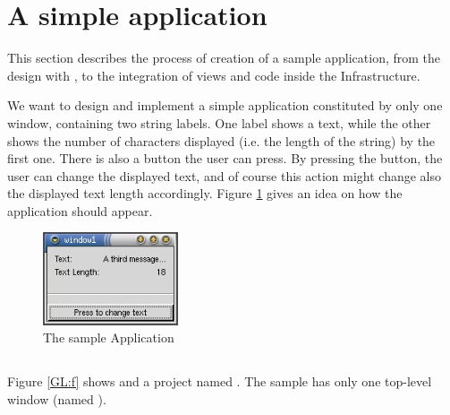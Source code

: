 

\section{\label{SAP} A simple application}
This section describes the process of creation of a sample
application, from the design with \glade, to the integration of views
and code inside the \mvco Infrastructure.

We want to design and implement a simple application constituted by
only one window, containing two string labels. One label shows a text,
while the other shows the number of characters displayed (i.e. the
length of the string) by the first one. There is also a button the
user can press. By pressing the button, the user can change the
displayed text, and of course this action might change also the
displayed text length accordingly. Figure \ref{EX:f} gives an idea on
how the application should appear.

\begin{figure}[htbp]
\begin{center}
\includegraphics[width=4cm]{figs/png/example.png}
\caption{\label{EX:f}The sample Application}
\end{center}
\end{figure}

\subsection{\label{GLEX}\glade}
Figure \ref{GL:f} shows \glade and a project named .
The sample \gui has only one top-level window (named
).

